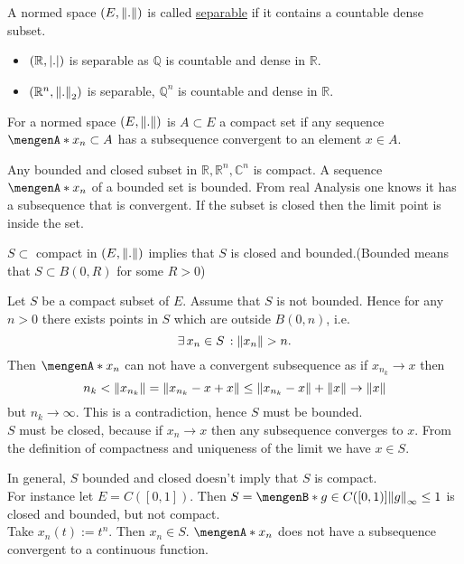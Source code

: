\begin{definition*}[separable]
	A normed space $(E,\norm{.})$ is called \underline{separable} if it contains a countable dense subset.
\end{definition*}
\begin{beispiele}
	\begin{itemize}
		\item $(\mathbb{R},\lvert.\rvert)$ is separable as $\mathbb{Q}$ is countable and dense in $\mathbb{R}$.
		\item $(\mathbb{R}^n,\norm{.}_2)$ is separable, $\mathbb{Q}^n$ is countable and dense in $\mathbb{R}$.
	\end{itemize}
\end{beispiele}
\begin{definition*}
	For a normed space $(E,\norm{.})$ is $A \subset E$ a compact set if any sequence $\set{x_n} \subset A$ has a subsequence convergent to an element $x \in A$.
\end{definition*}
\begin{beispiel}
	 Any bounded and closed subset in $\mathbb{R}, \mathbb{R}^n, \mathbb{C}^n$ is compact. A sequence $\set{x_n}$ of a bounded set is bounded. From real Analysis one knows it has a subsequence that is convergent. If the subset is closed then the limit point is inside the set. 
\end{beispiel}
\begin{lemma*}
	$S \subset$ compact in $(E, \norm{.})$ implies that $S$ is closed and bounded.(Bounded means that $S \subset B(0,R)$ for some $R>0$)
\end{lemma*}
\begin{beweis}
	Let $S$ be a compact subset of $E$. Assume that $S$ is not bounded. Hence for any $n >0$ there exists points in $S$ which are outside $B(0,n)$, i.e. 
	\[
		\exists\, x_n \in S \,: \norm{x_n} >n.
	\]
	Then $\set{x_n}$ can not have a convergent subsequence as if $x_{n_k} \to x$ then
	\[
		n_k < \norm{x_{n_k}} = \norm{x_{n_k}-x + x} \leq \norm{x_{n_k}-x} + \norm{x} \to \norm{x}
	\]
	but $n_k \to \infty$. This is a contradiction, hence $S$ must be bounded. \\ $S$ must be closed, because if $x_n \to x$ then any subsequence converges to $x$. From the definition of compactness and uniqueness of the limit we have $x \in S$. \\
\end{beweis}
\begin{bemerkung}
	In general, $S$ bounded and closed doesn't imply that $S$ is compact. \\
For instance let $E= C([0,1])$. Then $S=\set[g \in C([0,1])]{\norm{g}_{\infty}\leq 1}$ is closed and bounded, but not compact. \\
Take $x_n(t):=t^n$. Then $x_n \in S$. $\set{x_n}$ does not have a subsequence convergent to a continuous function.
\end{bemerkung}
